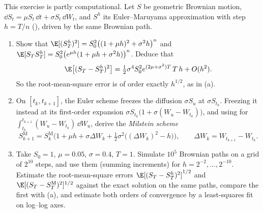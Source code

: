 \begin{exercise}\label{ex:sde-milstein}
\hard This exercise is partly computational. Let $S$ be geometric Brownian motion,
$\dd S_t=\mu S_t\,\dd t+\sigma S_t\,\dd W_t$, and $S^h$ its Euler--Maruyama approximation with
step $h=T/n$ (), driven by the same Brownian path.
\begin{enumerate}[label=(\alph*)]
  \item Show that $\E[(S^h_T)^2]=S_0^2\big((1+\mu h)^2+\sigma^2h\big)^n$ and
    $\E[S_TS^h_T]=S_0^2\big(e^{\mu h}(1+\mu h+\sigma^2h)\big)^n$. Deduce that
    \[
      \E\big[(S_T-S^h_T)^2\big]=\tfrac12\sigma^4S_0^2e^{(2\mu+\sigma^2)T}\,T\,h+O(h^2).
    \]
    So the root-mean-square error is of order exactly $h^{1/2}$, as in
    (a).
  \item On $[t_k,t_{k+1}]$, the Euler scheme freezes the diffusion $\sigma S_u$ at
    $\sigma S_{t_k}$. Freezing it instead at its first-order expansion
    $\sigma S_{t_k}\big(1+\sigma(W_u-W_{t_k})\big)$, and using  for
    $\int_{t_k}^{t_{k+1}}(W_u-W_{t_k})\,\dd W_u$, derive the \emph{Milstein scheme}
    \[
      S^{\mathrm M}_{k+1}=S^{\mathrm M}_k\Big(1+\mu h+\sigma\Delta W_k
      +\tfrac12\sigma^2\big((\Delta W_k)^2-h\big)\Big),\qquad
      \Delta W_k=W_{t_{k+1}}-W_{t_k}.
    \]
  \item Take $S_0=1$, $\mu=0.05$, $\sigma=0.4$, $T=1$. Simulate $10^5$ Brownian paths on a
    grid of $2^{10}$ steps, and use them (summing increments) for $h=2^{-2},\dots,2^{-10}$.
    Estimate the root-mean-square errors $\E[(S_T-S^h_T)^2]^{1/2}$ and
    $\E[(S_T-S^{\mathrm M}_T)^2]^{1/2}$ against the exact solution on the same paths, compare
    the first with (a), and estimate both orders of convergence by a least-squares fit on
    log--log axes.
\end{enumerate}
\end{exercise}
